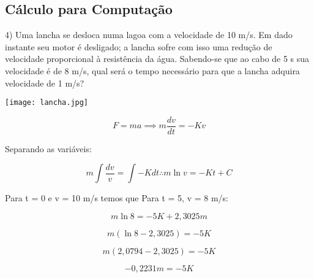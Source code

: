 \documentclass{beamer}
\begin{document}
	\subsection{Cálculo para Computação}
	\begin{frame}
		4) Uma lancha se desloca numa lagoa com a velocidade de 10 m/s. Em dado instante seu motor é desligado; a lancha sofre com isso uma redução de velocidade proporcional à resistência da água. Sabendo-se que ao cabo de 5 s sua velocidade é de 8 m/s, qual será o tempo necessário para que a lancha  adquira velocidade de 1 m/s?
		
		\centering
		\texttt{[image: lancha.jpg]}
		\label{}
	\end{frame}
	
	\begin{frame}
		\begin{displaymath}
			F = ma \implies m\frac{dv}{dt} = -Kv
		\end{displaymath} \pause
		
		Separando as variáveis:
		
		\begin{displaymath}
			m\int \frac{dv}{v} = \int -K dt \therefore m\ln v = -Kt + C
		\end{displaymath}
		
		Para t = 0 e v = 10 m/s temos que \boxed{ C = 2,3025m }
		Para t = 5, v = 8 m/s: \pause
		
		\begin{displaymath}
			m \ln 8 = - 5K + 2,3025m
		\end{displaymath} \pause
		
		\begin{displaymath}
			m(\ln 8 - 2,3025) = -5K
		\end{displaymath} \pause
		
		\begin{displaymath}
			m(2,0794 - 2,3025) = - 5K
		\end{displaymath} \pause
	
		\begin{equation}
			\boxed{ -0,2231m = - 5K }
		\end{equation}
	\end{frame}
\end{document}
